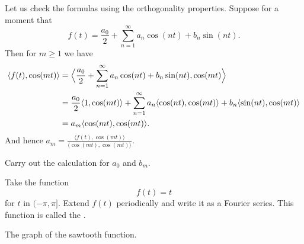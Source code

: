 \documentclass{ximera}
\begin{document}
Let us check the formulas using the orthogonality properties.  Suppose for a moment that
\begin{equation*}
f(t) = \frac{a_0}{2} + \sum_{n=1}^\infty a_n \cos (n t) + b_n \sin (n t) .
\end{equation*}
Then for $m \geq 1$ we have
\begin{equation*}
    \begin{split}
        \langle  f(t),\cos (mt)  \rangle
        & = \Bigl\langle  \frac{a_0}{2} + \sum_{n=1}^\infty a_n \cos (n t) + b_n
        \sin (n t) , \cos (mt)  \Bigr\rangle \\
        & = \frac{a_0}{2} \langle  1  ,  \cos (mt)  \rangle
        + \sum_{n=1}^\infty a_n \langle  \cos (nt)  ,  \cos (mt)  \rangle + b_n \langle  \sin (n t)  ,  \cos (mt)  \rangle \\
        & = a_m \langle  \cos (mt)  ,  \cos (mt)  \rangle .
    \end{split}
\end{equation*}
And hence $a_m = \frac{\langle  f(t)  ,  \cos (mt)  \rangle}{\langle  \cos (mt) , \cos (mt)  \rangle}$.

\begin{exercise}
    Carry out the calculation for $a_0$ and $b_m$.
\end{exercise}

\begin{example}
    Take the function
    \begin{equation*}
        f(t) = t
    \end{equation*}
    for $t$ in $(-\pi,\pi]$.  Extend $f(t)$ periodically and write it as a Fourier series.  This function is called the \emph{}.
    
    \begin{myfig}
        \capstart
        \caption{The graph of the sawtooth function.\label{ts:sawtoothfig}}
    \end{myfig}
\end{example}
\end{document}
